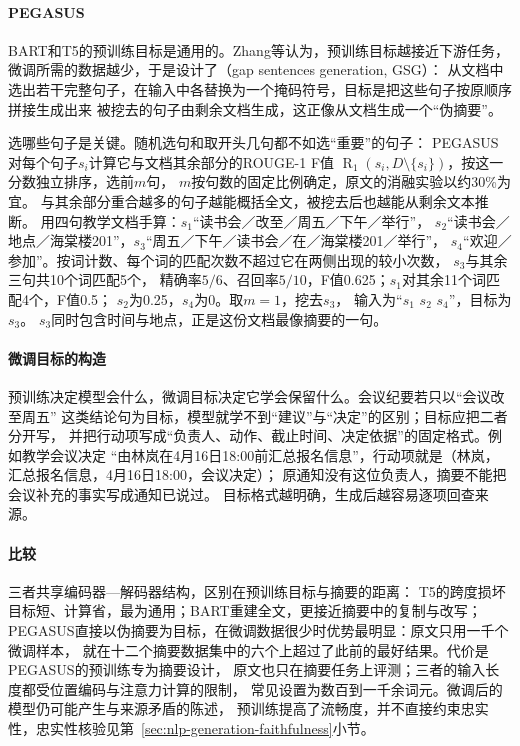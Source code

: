 \paragraph{PEGASUS}
BART和T5的预训练目标是通用的。Zhang等认为，预训练目标越接近下游任务，
微调所需的数据越少，于是设计了（gap sentences generation, GSG）：
从文档中选出若干完整句子，在输入中各替换为一个掩码符号，目标是把这些句子按原顺序拼接生成出来
被挖去的句子由剩余文档生成，这正像从文档生成一个“伪摘要”。

选哪些句子是关键。随机选句和取开头几句都不如选“重要”的句子：
PEGASUS对每个句子$s_i$计算它与文档其余部分的ROUGE-1 F值
$\operatorname{R}_1(s_i,D\setminus\{s_i\})$，按这一分数独立排序，选前$m$句，
$m$按句数的固定比例确定，原文的消融实验以约30\%为宜。
与其余部分重合越多的句子越能概括全文，被挖去后也越能从剩余文本推断。
用四句教学文档手算：$s_1$“读书会／改至／周五／下午／举行”，
$s_2$“读书会／地点／海棠楼201”，$s_3$“周五／下午／读书会／在／海棠楼201／举行”，
$s_4$“欢迎／参加”。按词计数、每个词的匹配次数不超过它在两侧出现的较小次数，
$s_3$与其余三句共10个词匹配5个，
精确率$5/6$、召回率$5/10$，F值0.625；$s_1$对其余11个词匹配4个，F值0.5；
$s_2$为0.25，$s_4$为0。取$m=1$，挖去$s_3$，
输入为“$s_1$ \code{[MASK1]} $s_2$ $s_4$”，目标为$s_3$。
$s_3$同时包含时间与地点，正是这份文档最像摘要的一句。

\paragraph{微调目标的构造}
预训练决定模型会什么，微调目标决定它学会保留什么。会议纪要若只以“会议改至周五”
这类结论句为目标，模型就学不到“建议”与“决定”的区别；目标应把二者分开写，
并把行动项写成“负责人、动作、截止时间、决定依据”的固定格式。例如教学会议决定
“由林岚在4月16日18:00前汇总报名信息”，行动项就是（林岚，汇总报名信息，4月16日18:00，会议决定）；
原通知没有这位负责人，摘要不能把会议补充的事实写成通知已说过。
目标格式越明确，生成后越容易逐项回查来源。

\paragraph{比较}
三者共享编码器—解码器结构，区别在预训练目标与摘要的距离：
T5的跨度损坏目标短、计算省，最为通用；BART重建全文，更接近摘要中的复制与改写；
PEGASUS直接以伪摘要为目标，在微调数据很少时优势最明显：原文只用一千个微调样本，
就在十二个摘要数据集中的六个上超过了此前的最好结果。代价是PEGASUS的预训练专为摘要设计，
原文也只在摘要任务上评测；三者的输入长度都受位置编码与注意力计算的限制，
常见设置为数百到一千余词元。微调后的模型仍可能产生与来源矛盾的陈述，
预训练提高了流畅度，并不直接约束忠实性，忠实性核验见第~\ref{sec:nlp-generation-faithfulness}小节。

